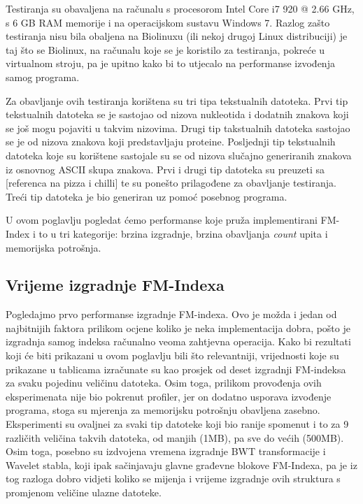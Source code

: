 Testiranja su obavaljena na računalu s procesorom Intel Core i7 920 @ 2.66 GHz, s 6 GB RAM memorije i na operacijskom sustavu Windows 7. Razlog zašto testiranja nisu bila obaljena na Biolinuxu (ili nekoj drugoj Linux distribuciji) je taj što se Biolinux, na računalu koje se je koristilo za testiranja, pokreće u virtualnom stroju, pa je upitno kako bi to utjecalo na performanse izvođenja samog programa.

Za obavljanje ovih testiranja korištena su tri tipa tekstualnih datoteka. Prvi tip tekstualnih datoteka se je sastojao od nizova nukleotida i dodatnih znakova koji se još mogu pojaviti u takvim nizovima. Drugi tip takstualnih datoteka sastojao se je od nizova znakova koji predstavljaju proteine. Posljednji tip tekstualnih datoteka koje su korištene sastojale su se od nizova slučajno generiranih znakova iz osnovnog ASCII skupa znakova. Prvi i drugi tip datoteka su preuzeti sa [referenca na pizza i chilli] te su ponešto prilagođene za obavljanje testiranja. Treći tip datoteka je bio generiran uz pomoć posebnog programa.

U ovom poglavlju pogledat ćemo performanse koje pruža implementirani FM-Index i to u tri kategorije: brzina izgradnje, brzina obavljanja \textit{count} upita i memorijska potrošnja.

\subsection{Vrijeme izgradnje FM-Indexa}
Pogledajmo prvo performanse izgradnje FM-indexa. Ovo je možda i jedan od najbitnijih faktora prilikom ocjene koliko je neka implementacija dobra, pošto je izgradnja samog indeksa računalno veoma zahtjevna operacija. Kako bi rezultati koji će biti prikazani u ovom poglavlju bili što relevantniji, vrijednosti koje su prikazane u tablicama izračunate su kao prosjek od deset izgradnji FM-indeksa za svaku pojedinu veličinu datoteka. Osim toga, prilikom provođenja ovih eksperimenata nije bio pokrenut profiler, jer on dodatno usporava izvođenje programa, stoga su mjerenja za memorijsku potrošnju obavljena zasebno. Eksperimenti su ovaljnei za svaki tip datoteke koji bio ranije spomenut i to za 9 različith veličina takvih datoteka, od manjih (1MB), pa sve do većih (500MB). Osim toga, posebno su izdvojena vremena izgradnje BWT transformacije i Wavelet stabla, koji ipak sačinjavaju glavne građevne blokove FM-Indexa, pa je iz tog razloga dobro vidjeti koliko se mijenja i vrijeme izgradnje ovih struktura s promjenom veličine ulazne datoteke.

